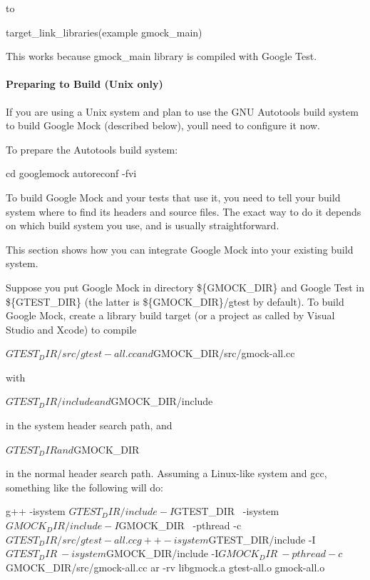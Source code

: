 to \begin{DoxyVerb}target_link_libraries(example gmock_main)
\end{DoxyVerb}


This works because {\ttfamily gmock\+\_\+main} library is compiled with Google Test.

\paragraph*{Preparing to Build (Unix only)}

If you are using a Unix system and plan to use the G\+NU Autotools build system to build Google Mock (described below), you\textquotesingle{}ll need to configure it now.

To prepare the Autotools build system\+: \begin{DoxyVerb}cd googlemock
autoreconf -fvi
\end{DoxyVerb}


To build Google Mock and your tests that use it, you need to tell your build system where to find its headers and source files. The exact way to do it depends on which build system you use, and is usually straightforward.

This section shows how you can integrate Google Mock into your existing build system.

Suppose you put Google Mock in directory {\ttfamily \$\{G\+M\+O\+C\+K\+\_\+\+D\+IR\}} and Google Test in {\ttfamily \$\{G\+T\+E\+S\+T\+\_\+\+D\+IR\}} (the latter is {\ttfamily \$\{G\+M\+O\+C\+K\+\_\+\+D\+IR\}/gtest} by default). To build Google Mock, create a library build target (or a project as called by Visual Studio and Xcode) to compile \begin{DoxyVerb}${GTEST_DIR}/src/gtest-all.cc and ${GMOCK_DIR}/src/gmock-all.cc
\end{DoxyVerb}


with \begin{DoxyVerb}${GTEST_DIR}/include and ${GMOCK_DIR}/include
\end{DoxyVerb}


in the system header search path, and \begin{DoxyVerb}${GTEST_DIR} and ${GMOCK_DIR}
\end{DoxyVerb}


in the normal header search path. Assuming a Linux-\/like system and gcc, something like the following will do\+: \begin{DoxyVerb}g++ -isystem ${GTEST_DIR}/include -I${GTEST_DIR} \
    -isystem ${GMOCK_DIR}/include -I${GMOCK_DIR} \
    -pthread -c ${GTEST_DIR}/src/gtest-all.cc
g++ -isystem ${GTEST_DIR}/include -I${GTEST_DIR} \
    -isystem ${GMOCK_DIR}/include -I${GMOCK_DIR} \
    -pthread -c ${GMOCK_DIR}/src/gmock-all.cc
ar -rv libgmock.a gtest-all.o gmock-all.o
\end{DoxyVerb}


